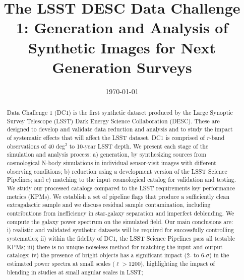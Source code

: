 \documentclass[a4paper,fleqn,usenatbib]{mnras}
\begin{document}
\title[LSST DESC DC1]{The LSST DESC Data Challenge 1: Generation and Analysis of Synthetic Images for Next Generation Surveys }
%

\date{\today}
\maketitle
\begin{abstract}
  Data Challenge 1 (DC1) is the first synthetic
  dataset produced by the Large Synoptic Survey Telescope (LSST)
  Dark Energy Science Collaboration (DESC). These are designed to
  develop and validate data reduction and analysis
  and to study the impact of systematic effects that
  will affect the LSST dataset. DC1 is comprised of $r$-band
  observations of 40 deg$^{2}$ to 10-year LSST depth. We present
  each stage of the simulation and analysis process: a) generation, by synthesizing sources from cosmological
  N-body simulations in individual sensor-visit images with different observing conditions; b)
  reduction using a development version of the
  LSST Science Pipelines; and c) matching to the input cosmological catalog for validation and testing. We
  study our processed catalogs compared to the
  LSST requirements key performance metrics (KPMs). We establish a
  set of pipeline flags that produce a sufficiently clean extragalactic sample and
  we discuss residual sample contamination, including contributions from 
  inefficiency in star-galaxy separation and imperfect deblending. We compute the galaxy power spectrum on the simulated field. Our main
  conclusions are: i) realistic and validated synthetic datasets will
  be required for successfully controlling systematics; ii) within the fidelity of DC1,
   the LSST Science Pipelines pass all testable KPMs;
   iii) there is no unique noiseless method for matching the input and output
  catalogs; iv) the presence of bright objects has a significant
  impact (2- to 6-$\sigma$) in the estimated power spectra at small scales ($\ell > 1200$),
  highlighting the impact of blending in studies at small angular scales in LSST; 
  


\end{abstract}
\end{document}
